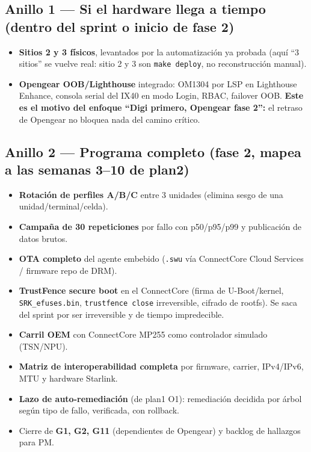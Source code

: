 \documentclass[11pt,a4paper]{article}
\begin{document}
\subsection*{Anillo 1 — Si el hardware llega a tiempo (dentro del sprint o inicio de fase 2)}
\begin{itemize}
  \item \textbf{Sitios 2 y 3 físicos}, levantados por la automatización ya probada (aquí ``3 sitios'' se vuelve real: sitio 2 y 3 son \texttt{make deploy}, no reconstrucción manual).
  \item \textbf{Opengear OOB/Lighthouse} integrado: OM1304 por LSP en Lighthouse Enhance, consola serial del IX40 en modo Login, RBAC, failover OOB. \textbf{Este es el motivo del enfoque ``Digi primero, Opengear fase 2'':} el retraso de Opengear no bloquea nada del camino crítico.
\end{itemize}

\subsection*{Anillo 2 — Programa completo (fase 2, mapea a las semanas 3–10 de plan2)}
\begin{itemize}
  \item \textbf{Rotación de perfiles A/B/C} entre 3 unidades (elimina sesgo de una unidad/terminal/celda).
  \item \textbf{Campaña de 30 repeticiones} por fallo con p50/p95/p99 y publicación de datos brutos.
  \item \textbf{OTA completo} del agente embebido (\texttt{.swu} vía ConnectCore Cloud Services / firmware repo de DRM).
  \item \textbf{TrustFence secure boot} en el ConnectCore (firma de U-Boot/kernel, \texttt{SRK\_efuses.bin}, \texttt{trustfence close} irreversible, cifrado de rootfs). Se saca del sprint por ser irreversible y de tiempo impredecible.
  \item \textbf{Carril OEM} con ConnectCore MP255 como controlador simulado (TSN/NPU).
  \item \textbf{Matriz de interoperabilidad completa} por firmware, carrier, IPv4/IPv6, MTU y hardware Starlink.
  \item \textbf{Lazo de auto-remediación} (de plan1 O1): remediación decidida por árbol según tipo de fallo, verificada, con rollback.
  \item Cierre de \textbf{G1, G2, G11} (dependientes de Opengear) y backlog de hallazgos para PM.
\end{itemize}
\end{document}
